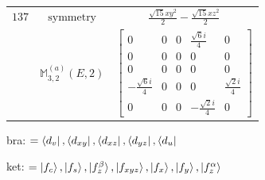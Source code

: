\documentclass[fleqn,8pt,landscape]{jsarticle}
\begin{document}
\begin{longtable}{ccc}
$ 137 $ & $ \text{symmetry} $ & $ \frac{\sqrt{15} x y^{2}}{2} - \frac{\sqrt{15} x z^{2}}{2} $ \\
$  $ & $ \mathbb{M}_{3,2}^{(a)}(E,2) $ & $ \begin{bmatrix} 0 & 0 & 0 & \frac{\sqrt{6} i}{4} & 0 \\ 0 & 0 & 0 & 0 & 0 \\ 0 & 0 & 0 & 0 & 0 \\ - \frac{\sqrt{6} i}{4} & 0 & 0 & 0 & \frac{\sqrt{2} i}{4} \\ 0 & 0 & 0 & - \frac{\sqrt{2} i}{4} & 0 \end{bmatrix} $ \\ \hline
\end{longtable}
bra: $=\bra{d_{v}}, \bra{d_{xy}}, \bra{d_{xz}}, \bra{d_{yz}}, \bra{d_{u}}$

\noindent
ket: $=\ket{f_{c}}, \ket{f_{s}}, \ket{f_{z}^{\beta}}, \ket{f_{xyz}}, \ket{f_{x}}, \ket{f_{y}}, \ket{f_{z}^{\alpha}}$
\renewcommand{\arraystretch}{1.6}
\end{document}
